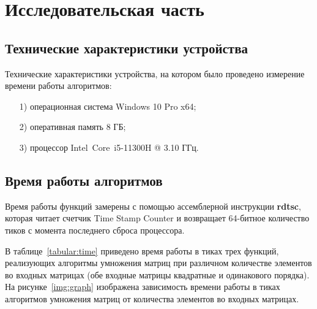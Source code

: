 \chapter{Исследовательская часть}
\section{Технические характеристики устройства}

Технические характеристики устройства, на котором было проведено измерение времени работы алгоритмов:

\begin{enumerate}
\item[1)]
операционная система Windows 10 Pro x64;
\item[2)]
оперативная память 8 ГБ;
\item[3)]
процессор Intel\textregistered ~Core\texttrademark ~i5-11300H @ 3.10 ГГц.
\end{enumerate}

\section{Время работы алгоритмов}

Время работы функций замерены с помощью ассемблерной инструкции \textbf{rdtsc}, которая читает счетчик Time Stamp Counter и возвращает 64-битное количество тиков с момента последнего сброса процессора.

В таблице~\ref{tabular:time} приведено время работы в тиках трех функций, реализующих алгоритмы умножения матриц при различном количестве элементов во входных матрицах (обе входные матрицы квадратные и одинакового порядка). На рисунке~\ref{img:graph} изображена зависимость времени работы в тиках алгоритмов умножения матриц от количества элементов во входных матрицах.

